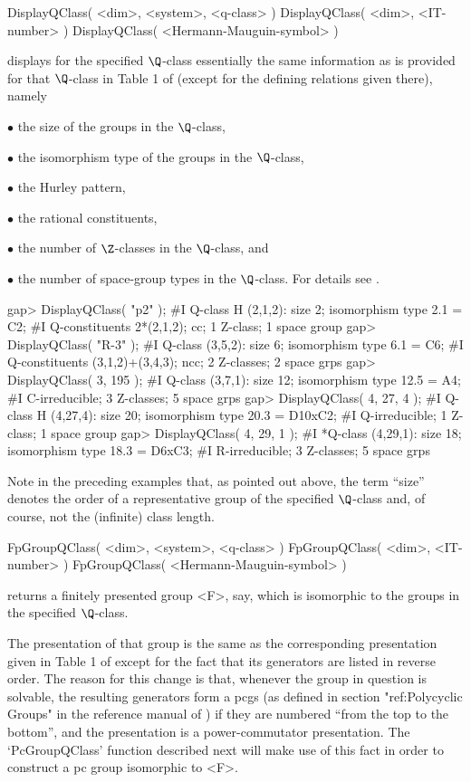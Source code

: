 \>DisplayQClass( <dim>, <system>, <q-class> )
\>DisplayQClass( <dim>, <IT-number> )
\>DisplayQClass( <Hermann-Mauguin-symbol> )

displays for the specified $\Q$-class essentially the same information
as is provided for that $\Q$-class in Table 1 of \cite{BBNWZ78}
(except for the defining relations given there), namely
\beginlist
\item{$\bullet$} the size of the groups in the $\Q$-class,
\item{$\bullet$} the isomorphism type of the groups in the $\Q$-class,
\item{$\bullet$} the Hurley pattern,
\item{$\bullet$} the rational constituents,
\item{$\bullet$} the number of $\Z$-classes in the $\Q$-class, and
\item{$\bullet$} the number of space-group types in the $\Q$-class.
\endlist
For details see \cite{BBNWZ78}.

\beginexample
gap> DisplayQClass( "p2" );
#I   Q-class H (2,1,2): size 2; isomorphism type 2.1 = C2;
#I    Q-constituents 2*(2,1,2); cc; 1 Z-class; 1 space group
gap> DisplayQClass( "R-3" );
#I   Q-class (3,5,2): size 6; isomorphism type 6.1 = C6;
#I    Q-constituents (3,1,2)+(3,4,3); ncc; 2 Z-classes; 2 space grps
gap> DisplayQClass( 3, 195 );
#I   Q-class (3,7,1): size 12; isomorphism type 12.5 = A4;
#I    C-irreducible; 3 Z-classes; 5 space grps
gap> DisplayQClass( 4, 27, 4 );
#I   Q-class H (4,27,4): size 20; isomorphism type 20.3 = D10xC2;
#I    Q-irreducible; 1 Z-class; 1 space group
gap> DisplayQClass( 4, 29, 1 );
#I  *Q-class (4,29,1): size 18; isomorphism type 18.3 = D6xC3;
#I    R-irreducible; 3 Z-classes; 5 space grps
\endexample

Note in the preceding examples that, as pointed out above, the term
``size'' denotes the order of a representative group of the specified
$\Q$-class and, of course, not the (infinite) class length.

\>FpGroupQClass( <dim>, <system>, <q-class> )
\>FpGroupQClass( <dim>, <IT-number> )
\>FpGroupQClass( <Hermann-Mauguin-symbol> )

returns a finitely presented group <F>, say, which is isomorphic to
the groups in the specified $\Q$-class.

The presentation of that group is the same as the corresponding
presentation given in Table 1 of \cite{BBNWZ78} except for the fact
that its generators are listed in reverse order.  The reason for this
change is that, whenever the group in question is solvable, the
resulting generators form a pcgs (as defined in section "ref:Polycyclic
Groups" in the reference manual of {\GAP}) if they are numbered 
``from the top to the bottom'', and the presentation is a 
power-commutator presentation.  The `PcGroupQClass' function described 
next will make use of this fact in order to construct a pc group 
isomorphic to <F>.

